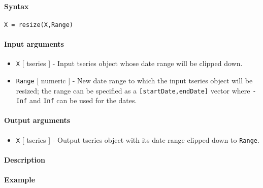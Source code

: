 


	\paragraph{Syntax}\label{syntax}

\begin{verbatim}
X = resize(X,Range)
\end{verbatim}

\paragraph{Input arguments}\label{input-arguments}

\begin{itemize}
\item
  \texttt{X} {[} tseries {]} - Input tseries object whose date range
  will be clipped down.
\item
  \texttt{Range} {[} numeric {]} - New date range to which the input
  tseries object will be resized; the range can be specified as a
  \texttt{{[}startDate,endDate{]}} vector where \texttt{-Inf} and
  \texttt{Inf} can be used for the dates.
\end{itemize}

\paragraph{Output arguments}\label{output-arguments}

\begin{itemize}
\itemsep1pt\parskip0pt
\item
  \texttt{X} {[} tseries {]} - Output tseries object with its date range
  clipped down to \texttt{Range}.
\end{itemize}

\paragraph{Description}\label{description}

\paragraph{Example}\label{example}


